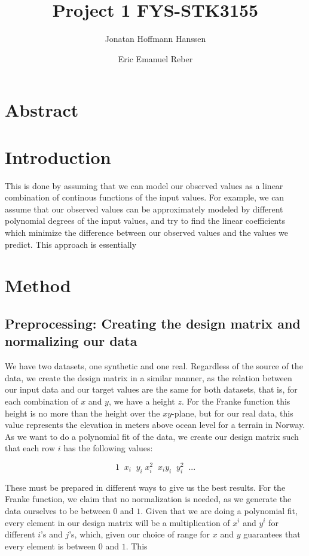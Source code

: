\documentclass{article}
\author{Jonatan Hoffmann Hanssen \and Eric Emanuel Reber}
\title{Project 1 FYS-STK3155}
\begin{document}
	\maketitle

\section*{Abstract}

\section*{Introduction}

This is done by assuming that we can model our observed values as a linear combination of continous functions of the input values. For example, we can assume that our observed values can be approximately modeled by different polynomial degrees of the input values, and try to find the linear coefficients which minimize the difference between our observed values and the values we predict. This approach is essentially 


\section{Method}
\subsection{Preprocessing: Creating the design matrix and normalizing our data}

We have two datasets, one synthetic and one real. Regardless of the source of the data, we create the design matrix in a similar manner, as the relation between our input data and our target values are the same for both datasets, that is, for each combination of $x$ and $y$, we have a height $z$. For the Franke function this height is no more than the height over the $xy$-plane, but for our real data, this value represents the elevation in meters above ocean level for a terrain in Norway. As we want to do a polynomial fit of the data, we create our design matrix such that each row $i$ has the following values:

\[ 1 \;\; x_i \;\; y_i \; x_i^2 \;\; x_i y_i \;\; y_i^2 \;\; ...\]


These must be prepared in different ways to give us the best results. For the Franke function, we claim that no normalization is needed, as we generate the data ourselves to be between $0$ and $1$. Given that we are doing a polynomial fit, every element in our design matrix will be a multiplication of $x^i$ and $y^i$ for different $i$'s and $j$'s, which, given our choice of range for $x$ and $y$ guarantees that every element is between $0$ and $1$. This 
\end{document}
